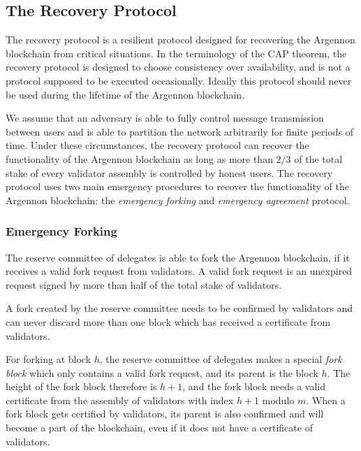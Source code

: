 \subsection{The Recovery Protocol}\label{subsec:recovery}

The recovery protocol is a resilient protocol designed for recovering the Argennon blockchain from critical situations.
In the terminology of the CAP theorem, the recovery protocol is designed to choose consistency over availability,
and is not a protocol supposed to be executed occasionally. Ideally this protocol should never be used
during the lifetime of the Argennon blockchain.

We assume that an adversary is able to fully control message transmission between users and is able to partition the
network arbitrarily for finite periods of time. Under these circumstances, the recovery protocol can recover the
functionality of the Argennon blockchain as long as more than $2/3$ of the total stake of every validator assembly is
controlled by honest users. The recovery protocol uses two main emergency procedures to
recover the functionality of the Argennon blockchain: the \emph{emergency forking} and \emph{emergency
agreement} protocol.

\subsubsection{Emergency Forking}

The reserve committee of delegates is able to fork the Argennon blockchain, if it receives a valid fork request
from validators.
A valid fork request is an unexpired request signed by more than half of the total stake of validators.

A fork created by the reserve committee needs to be confirmed by validators and can never discard more than one
block which has received a certificate from validators.

For forking at block $h$, the reserve committee of delegates
makes a special \emph{fork block} which only contains a valid fork request, and its parent is the block $h$.
The height of the fork block therefore is $h + 1$, and the fork block needs a valid certificate from the assembly of
validators with index $h+1$ modulo $m$. When a
fork block gets certified by validators, its parent is also confirmed and will become a part of the blockchain, even if
it does not have a certificate of validators.

